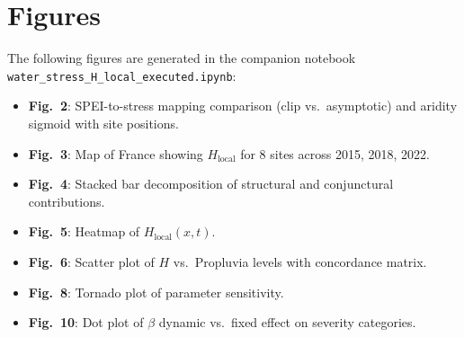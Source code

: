 \documentclass[11pt,a4paper]{article}
\begin{document}
\section{Figures}

The following figures are generated in the companion notebook \texttt{water\_stress\_H\_local\_executed.ipynb}:

\begin{itemize}
  \item \textbf{Fig.~2}: SPEI-to-stress mapping comparison (clip vs.\ asymptotic) and aridity sigmoid with site positions.
  \item \textbf{Fig.~3}: Map of France showing $H_{\text{local}}$ for 8 sites across 2015, 2018, 2022.
  \item \textbf{Fig.~4}: Stacked bar decomposition of structural and conjunctural contributions.
  \item \textbf{Fig.~5}: Heatmap of $H_{\text{local}}(x,t)$.
  \item \textbf{Fig.~6}: Scatter plot of $H$ vs.\ Propluvia levels with concordance matrix.
  \item \textbf{Fig.~8}: Tornado plot of parameter sensitivity.
  \item \textbf{Fig.~10}: Dot plot of $\beta$ dynamic vs.\ fixed effect on severity categories.
\end{itemize}
\end{document}
